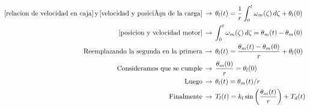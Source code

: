 \documentclass[a4paper, 10pt, onecolumn,journal]{ieeeconf}
\begin{document}
\begin{equation}
    \begin{aligned}
        \cref{relacion de velocidad en caja} \,\text{y}\, \cref{velocidad y posición de la carga}\,&\rightarrow\,\theta_l(t) = \frac{1}{r} \int_{0}^{t} \omega_m(\zeta) \, d\zeta + \theta_l(0)\\
        \cref{posicion y velocidad motor}\,&\rightarrow\,  \int_{0}^{t} \omega_m(\zeta) \, d\zeta = \theta_m(t) - \theta_m(0)\\
        \text{Reemplazando la segunda en la primera}\,&\rightarrow\,\theta_l(t) = \frac{\theta_m(t) - \theta_m(0)}{r} + \theta_l(0)\\
        \text{Consideramos que se cumple}\,&\rightarrow\,\frac{\theta_m(0)}{r} = \theta_l(0)\\
        \text{Luego}\,&\rightarrow\,\theta_l(t) = \theta_m(t)/r\\
        \text{Finalmente}\,&\rightarrow\,T_l(t) = k_l\sin\left(\frac{\theta_m(t)}{r}\right) + T_d(t)
    \end{aligned}
    \label{reemplazo de T_l}
\end{equation}
\end{document}
